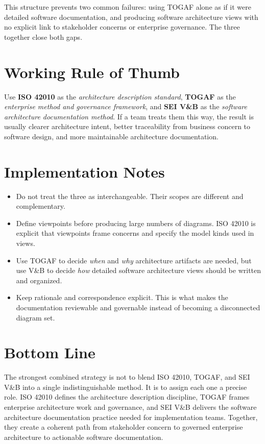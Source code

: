 \documentclass[11pt]{article}
\begin{document}
This structure prevents two common failures: using TOGAF alone as if it were detailed software documentation, and producing software architecture views with no explicit link to stakeholder concerns or enterprise governance. The three together close both gaps.\cite{togafstd,iso42010cm,sei_vb_book}

\section*{Working Rule of Thumb}
Use \textbf{ISO 42010} as the \emph{architecture description standard}, \textbf{TOGAF} as the \emph{enterprise method and governance framework}, and \textbf{SEI V\&B} as the \emph{software architecture documentation method}. If a team treats them this way, the result is usually clearer architecture intent, better traceability from business concern to software design, and more maintainable architecture documentation.\cite{iso42010ads,togafstd,sei_vb_factsheet}

\section*{Implementation Notes}
\begin{itemize}[leftmargin=1.5em]
    \item Do not treat the three as interchangeable. Their scopes are different and complementary.\cite{iso42010ads,togafstd,sei_vb_book}
    \item Define viewpoints before producing large numbers of diagrams. ISO 42010 is explicit that viewpoints frame concerns and specify the model kinds used in views.\cite{iso42010gettingstarted,iso42010cm}
    \item Use TOGAF to decide \emph{when} and \emph{why} architecture artifacts are needed, but use V\&B to decide \emph{how} detailed software architecture views should be written and organized.\cite{togafstd,sei_vb_book}
    \item Keep rationale and correspondence explicit. This is what makes the documentation reviewable and governable instead of becoming a disconnected diagram set.\cite{iso42010cm,iso42010faq,sei_vb_book}
\end{itemize}

\section*{Bottom Line}
The strongest combined strategy is not to blend ISO 42010, TOGAF, and SEI V\&B into a single indistinguishable method. It is to assign each one a precise role. ISO 42010 defines the architecture description discipline, TOGAF frames enterprise architecture work and governance, and SEI V\&B delivers the software architecture documentation practice needed for implementation teams. Together, they create a coherent path from stakeholder concern to governed enterprise architecture to actionable software documentation.\cite{iso42010cm,iso42010ads,togafstd,sei_vb_factsheet,sei_vb_book}
\end{document}
